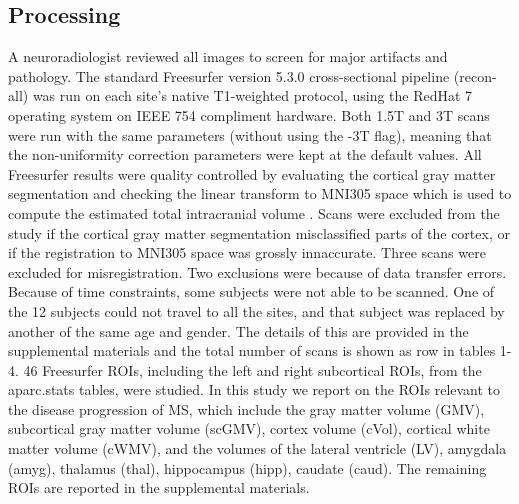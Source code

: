 \subsection{Processing}
 A neuroradiologist reviewed all images to screen for major artifacts and pathology. The standard Freesurfer \cite{freesurferPaper} version 5.3.0 cross-sectional pipeline (recon-all) was run on each site's native T1-weighted protocol, using the RedHat 7 operating system on IEEE 754 compliment hardware. Both 1.5T and 3T scans were run with the same parameters (without using the -3T flag), meaning that the non-uniformity correction parameters were kept at the default values. All Freesurfer results were quality controlled by evaluating the cortical gray matter segmentation and checking the  linear transform to MNI305 space which is used to compute the estimated total intracranial volume \cite{buckner2004unified}. Scans were excluded from the study if the cortical gray matter segmentation misclassified parts of the cortex, or if the registration to MNI305 space was grossly innaccurate. Three scans were excluded for misregistration. Two exclusions were because of data transfer errors. Because of time constraints, some subjects were not able to be scanned. One of the 12 subjects could not travel to all the sites, and that subject was replaced by another of the same age and gender. The details of this are provided in the supplemental materials and the total number of scans is shown as row in tables 1-4. 46 Freesurfer ROIs, including the left and right subcortical ROIs, from the aparc.stats tables, were studied. In this study we report on the ROIs relevant to the disease progression of MS, which include the gray matter volume (GMV), subcortical gray matter volume (scGMV), cortex volume (cVol), cortical white matter volume (cWMV), and the volumes of the lateral ventricle (LV), amygdala (amyg), thalamus (thal), hippocampus (hipp), caudate (caud). The remaining ROIs are reported in the supplemental materials. 